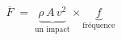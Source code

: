 \documentclass[preview]{standalone}
\begin{document}
\begin{align*}
\overline{F} \;=\; \underbrace{\rho\,A\,v^2}_{\text{un impact}} \times \underbrace{f}_{\text{fréquence}}
\end{align*}
\end{document}
